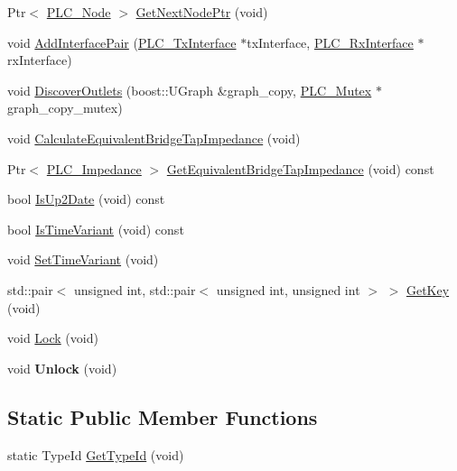 \begin{DoxyCompactItemize}
\item 
\-Ptr$<$ \hyperlink{classns3_1_1PLC__Node}{\-P\-L\-C\-\_\-\-Node} $>$ \hyperlink{classns3_1_1PLC__BackboneBranch_a395f8ecf621d2feb3ca11243fa39640c}{\-Get\-Next\-Node\-Ptr} (void)
\item 
void \hyperlink{classns3_1_1PLC__BackboneBranch_afbf5d1cd2a13916d7a4cf6057b7cd81c}{\-Add\-Interface\-Pair} (\hyperlink{classns3_1_1PLC__TxInterface}{\-P\-L\-C\-\_\-\-Tx\-Interface} $\ast$tx\-Interface, \hyperlink{classns3_1_1PLC__RxInterface}{\-P\-L\-C\-\_\-\-Rx\-Interface} $\ast$rx\-Interface)
\item 
void \hyperlink{classns3_1_1PLC__BackboneBranch_af026ecb7063aa1214155fab86c909710}{\-Discover\-Outlets} (boost\-::\-U\-Graph \&graph\-\_\-copy, \hyperlink{structns3_1_1PLC__Mutex}{\-P\-L\-C\-\_\-\-Mutex} $\ast$graph\-\_\-copy\-\_\-mutex)
\item 
void \hyperlink{classns3_1_1PLC__BackboneBranch_adfe4499983e8d55525aacb70a69ffb49}{\-Calculate\-Equivalent\-Bridge\-Tap\-Impedance} (void)
\item 
\-Ptr$<$ \hyperlink{classns3_1_1PLC__ValueBase}{\-P\-L\-C\-\_\-\-Impedance} $>$ \hyperlink{classns3_1_1PLC__BackboneBranch_a07cb86efbad5b228b71fc839d0b2c17b}{\-Get\-Equivalent\-Bridge\-Tap\-Impedance} (void) const 
\item 
bool \hyperlink{classns3_1_1PLC__BackboneBranch_acdb29c19ea9a36c0078cb4f46e09ac97}{\-Is\-Up2\-Date} (void) const 
\item 
bool \hyperlink{classns3_1_1PLC__BackboneBranch_a0d7422e7b9c34586641d5ac3724aa77d}{\-Is\-Time\-Variant} (void) const 
\item 
void \hyperlink{classns3_1_1PLC__BackboneBranch_a043df96872850196aa2050e59f14aa7b}{\-Set\-Time\-Variant} (void)
\item 
std\-::pair$<$ unsigned int, \*
std\-::pair$<$ unsigned int, \*
unsigned int $>$ $>$ \hyperlink{classns3_1_1PLC__BackboneBranch_ab45c9e8646f7cba2e2b9e82782dfebee}{\-Get\-Key} (void)
\item 
void \hyperlink{classns3_1_1PLC__BackboneBranch_aa9081c674aa58e212d27b611ef04b6e7}{\-Lock} (void)
\item 
\hypertarget{classns3_1_1PLC__BackboneBranch_afdb9175e09669f9a77d05286340b1b7b}{void {\bfseries \-Unlock} (void)}\label{classns3_1_1PLC__BackboneBranch_afdb9175e09669f9a77d05286340b1b7b}

\end{DoxyCompactItemize}
\subsection*{\-Static \-Public \-Member \-Functions}
\begin{DoxyCompactItemize}
\item 
static \-Type\-Id \hyperlink{classns3_1_1PLC__BackboneBranch_a64a11d6315fb88b93e4dde96d39471a4}{\-Get\-Type\-Id} (void)
\end{DoxyCompactItemize}
